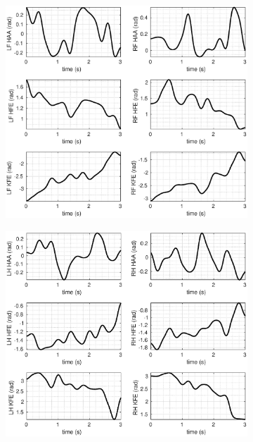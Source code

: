 \documentclass[usletter, 10pt, conference]{ieeeconf}      %
\begin{document}
\begin{figure}[h!]
   \vspace*{-3mm}
    \begin{subfigure}[b]{0.52\textwidth}
        \centering
        \includegraphics[width=\textwidth]{PRec_GaussSol_1of2_ICRA_e.eps}
    \end{subfigure}
    \begin{subfigure}[b]{0.52\textwidth}
     \vspace*{-5mm}
     \centering
     \includegraphics[width=\textwidth]{PRec_GaussSol_2of2_ICRA_e.eps}

\end{subfigure}
\end{figure}
\end{document}
